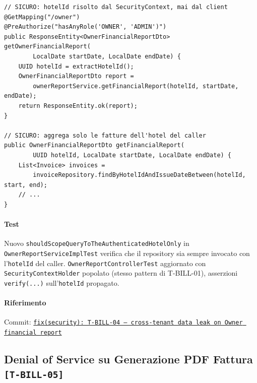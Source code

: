 ﻿\documentclass[a4paper,12pt]{report}
\newcommand{\commitref}[2]{\texttt{\small \href{https://github.com/diegoandruccioli/hotel-pms/commit/#1}{#2}}}
\newcommand{\threat}[1]{\texttt{\small\textcolor{vulnred}{[#1]}}}
\begin{document}
\begin{securebox}[title={Codice Sicuro --- OwnerReportController/ServiceImpl.java (fix)}]
\begin{lstlisting}[style=java]
// SICURO: hotelId risolto dal SecurityContext, mai dal client
@GetMapping("/owner")
@PreAuthorize("hasAnyRole('OWNER', 'ADMIN')")
public ResponseEntity<OwnerFinancialReportDto> getOwnerFinancialReport(
        LocalDate startDate, LocalDate endDate) {
    UUID hotelId = extractHotelId();
    OwnerFinancialReportDto report =
        ownerReportService.getFinancialReport(hotelId, startDate, endDate);
    return ResponseEntity.ok(report);
}

// SICURO: aggrega solo le fatture dell'hotel del caller
public OwnerFinancialReportDto getFinancialReport(
        UUID hotelId, LocalDate startDate, LocalDate endDate) {
    List<Invoice> invoices =
        invoiceRepository.findByHotelIdAndIssueDateBetween(hotelId, start, end);
    // ...
}
\end{lstlisting}
\end{securebox}

\paragraph{Test}
Nuovo \texttt{shouldScopeQueryToTheAuthenticatedHotelOnly} in \texttt{OwnerReportServiceImplTest}
verifica che il repository sia sempre invocato con l'\texttt{hotelId} del caller.
\texttt{OwnerReportControllerTest} aggiornato con \texttt{SecurityContextHolder} popolato
(stesso pattern di T-BILL-01), asserzioni \texttt{verify(...)} sull'\texttt{hotelId} propagato.

\paragraph{Riferimento} Commit: \commitref{c983946}{fix(security): T-BILL-04 --- cross-tenant data leak on Owner financial report}

\subsection{Denial of Service su Generazione PDF Fattura \threat{T-BILL-05}}
\end{document}
